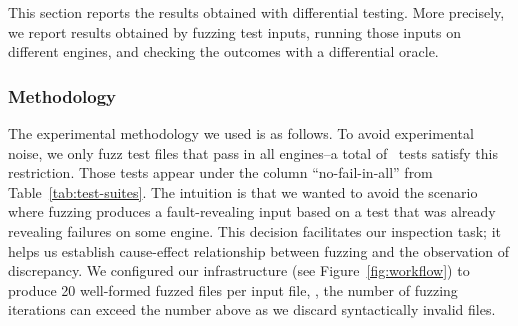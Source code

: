 \documentclass[10pt,conference,anonymous]{IEEEtran}
\begin{document}
This section reports the results obtained with differential
testing. More precisely, we report results obtained by fuzzing test
inputs, running those inputs on different engines, and checking the
outcomes with a differential oracle.

\vspace{0.5ex}
\subsubsection{Methodology}
The experimental methodology we used is as follows. To avoid
experimental noise, we only fuzz test files that pass in all
engines--a total of \totalTestFilesPassInAll\ tests satisfy this
restriction.  Those tests appear under the column ``no-fail-in-all''
from Table~\ref{tab:test-suites}.  The intuition is that we wanted to
avoid the scenario where fuzzing produces a fault-revealing input
based on a test that was already revealing failures on some
engine. This decision facilitates our inspection task; it helps us
establish cause-effect relationship between fuzzing and the
observation of discrepancy.  We configured our infrastructure (see
Figure~\ref{fig:workflow}) to produce 20 well-formed fuzzed files per
input file, \ie{}, the number of fuzzing iterations can exceed the
number above as we discard syntactically invalid files.

\end{document}
